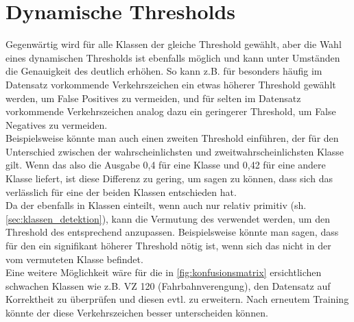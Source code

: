 \documentclass[12pt,a4paper,ngerman,enabledeprecatedfontcommands]{scrreprt}
\begin{document}
\section{Dynamische Thresholds}
Gegenwärtig wird für alle Klassen der gleiche Threshold gewählt, aber die Wahl eines dynamischen Thresholds ist ebenfalls möglich und kann unter Umständen die Genauigkeit des  deutlich erhöhen. So kann z.B. für besonders häufig im Datensatz vorkommende Verkehrszeichen ein etwas höherer Threshold gewählt werden, um False Positives zu vermeiden, und für selten im Datensatz vorkommende Verkehrszeichen analog dazu ein geringerer Threshold, um False Negatives zu vermeiden.\\
Beispielsweise könnte man auch einen zweiten Threshold einführen, der für den Unterschied zwischen der wahrscheinlichsten und zweitwahrscheinlichsten Klasse gilt. Wenn das  also die Ausgabe 0,4 für eine Klasse und 0,42 für eine andere Klasse liefert, ist diese Differenz zu gering, um sagen zu können, dass sich das  verlässlich für eine der beiden Klassen entschieden hat.\\
Da der  ebenfalls in Klassen einteilt, wenn auch nur relativ primitiv (sh. \cref{sec:klassen_detektion}), kann die Vermutung des  verwendet werden, um den Threshold des  entsprechend anzupassen. Beispielsweise könnte man sagen, dass für den  ein signifikant höherer Threshold nötig ist, wenn sich das  nicht in der vom  vermuteten Klasse befindet.\\
Eine weitere Möglichkeit wäre für die in \cref{fig:konfusionsmatrix} ersichtlichen schwachen Klassen wie z.B. \gls{VZ} 120 (Fahrbahnverengung), den Datensatz auf Korrektheit zu überprüfen und diesen evtl. zu erweitern. Nach erneutem Training könnte der  diese Verkehrszeichen besser unterscheiden können. 
\end{document}
